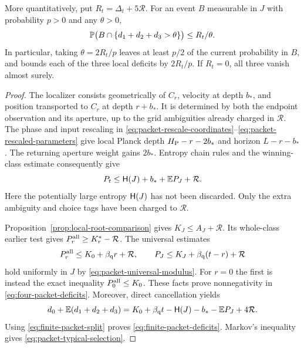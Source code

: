 \begin{proposition}
More quantitatively, put $R_t=\Delta_t+5\mathcal R$.
For an event $B$ measurable in $J$ with probability $p>0$ and any
$\theta>0$,
\begin{equation}\label{eq:packet-typical-selection}
 \mathbb P\bigl(B\cap\{d_1+d_2+d_3>\theta\}\bigr)
       \le R_t/\theta.
\end{equation}
In particular, taking $\theta=2R_t/p$ leaves at least $p/2$ of the
current probability in $B$, and bounds each of the three local
deficits by $2R_t/p$.  If $R_t=0$, all three vanish almost surely.
\end{proposition}

\begin{proof}
The localizer consists geometrically of $C_r$, velocity at depth
$b_*$, and position transported to $C_r$ at depth $r+b_*$.
It is determined by both the endpoint observation and its aperture,
up to the grid ambiguities already charged in $\mathcal R$.
The phase and input rescaling in
\eqref{eq:packet-rescale-coordinates}--\eqref{eq:packet-rescaled-parameters}
give local Planck depth $H_{\mathrm P}-r-2b_*$ and horizon $L-r-b_*$.
The returning aperture weight gains $2b_*$.  Entropy chain rules and
the winning-class estimate consequently give
\begin{equation}\label{eq:finite-packet-split}
 P_t\le\mathsf H(J)+b_*+\mathbb E P_J+\mathcal R.
\end{equation}
Here the potentially large entropy $\mathsf H(J)$ has not been discarded.
Only the extra ambiguity and choice tags have been charged to
$\mathcal R$.

Proposition~\ref{prop:local-root-comparison} gives
$K_J\le A_J+\mathcal R$.  Its whole-class earlier test gives
$P_r^{\rm all}\ge K_r^*-\mathcal R$.
The universal estimates
\[
 P_r^{\rm all}\le K_0+\beta_{\mathrm q} r+\mathcal R,
 \qquad P_J\le K_J+\beta_{\mathrm q}(t-r)+\mathcal R
\]
hold uniformly in $J$ by \eqref{eq:packet-universal-modulus}.
For $r=0$ the first is instead the exact inequality
$P_0^{\rm all}\le K_0$.
These facts prove nonnegativity in
\eqref{eq:four-packet-deficits}.  Moreover, direct cancellation yields
\[
 d_0+\mathbb E(d_1+d_2+d_3)
 =K_0+\beta_{\mathrm q} t-\mathsf H(J)-b_*-\mathbb E P_J+4\mathcal R.
\]
Using \eqref{eq:finite-packet-split} proves
\eqref{eq:finite-packet-deficits}.  Markov's inequality gives
\eqref{eq:packet-typical-selection}.


\end{proof}
